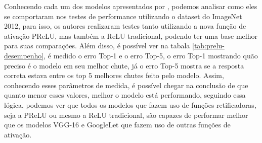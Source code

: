 Conhecendo cada um dos modelos apresentados por \textcite{PReLUArticle}, podemos analisar como eles se comportaram nos testes de performance utilizando o dataset do ImageNet 2012, para isso, os autores realizaram testes tanto utilizando a nova função de ativação PReLU, mas também a ReLU tradicional, podendo ter uma base melhor para suas comparações. Além disso, é possível ver na tabala \ref{tab:prelu-desempenho}, é medido o erro Top-1 e o erro Top-5, o erro Top-1 mostrando quão preciso é o modelo em seu melhor chute, já o erro Top-5 mostra se a resposta correta estava entre os top 5 melhores chutes feito pelo modelo. Assim, conhecendo esses parâmetros de medida, é possível chegar na conclusão de que quanto menor esses valores, melhor o modelo está performando, seguindo essa lógica, podemos ver que todos os modelos que fazem uso de funções retificadoras, seja a PReLU ou mesmo a ReLU tradicional, são capazes de performar melhor que os modelos VGG-16 e GoogleLet que fazem uso de outras funções de ativação.


